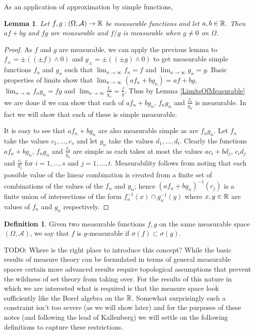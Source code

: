 \documentclass{amsart}
\newtheorem{lem}[thm]{Lemma}
\theoremstyle{remark}
\theoremstyle{definition}
\newtheorem{defn}[thm]{Definition}
\begin{document}
As an application of approximation by simple functions, 
\begin{lem}\label{ArithmeticCombinationsOfMeasurableFunctions}
Let $f,g : (\Omega, \mathcal{A}) \to \mathbb{R}$ be measurable functions
and let $a,b \in \mathbb{R}$.  Then $af + bg$ and $fg$ are measurable and
$f/g$ is measurable when $g \neq 0$ on $\Omega$.
\end{lem}
\begin{proof}As $f$ and $g$ are measurable, we can apply the previous
  lemma to $f_\pm = \pm((\pm f) \wedge 0)$ and $g_{\pm} = \pm((\pm g) \wedge 0)$
  to get measurable simple functions $f_n$ and $g_n$ such that $\lim_{n \to
    \infty} f_n = f$ and $\lim_{n \to
    \infty} g_n = g$.  Basic properties of limits show that $\lim_{n
    \to \infty} (a f_n + b g_n) = a f + b g$, $\lim_{n \to \infty} f_n
  g_n = f g$ and $\lim_{n \to \infty} \frac{f_n}{  g_n} =
  \frac{f}{g}$.  Thus by Lemma \ref{LimitsOfMeasurable} we are done if
  we can show that each of $a f_n + b g_n$, $f_n g_n$ and
  $\frac{f_n}{g_n}$ is measurable.  In fact we will show that each of
  these is simple measurable.

It is easy to see that $a f_n + b g_n$ are also
  measurable simple as are $f_n g_n$.  Let $f_n$ take the values $c_1,
  \dots, c_s$ and let $g_n$ take the values $d_1, \dots, d_t$.  
Clearly the functions  $a f_n + b g_n$, $f_n g_n$ and
  $\frac{f_n}{g_n}$ are simple as each takes at most the values  $a c_i + b d_j$, $c_i d_j$ and
  $\frac{c_i}{d_j}$ for $i=1,\dots,s$ and $j=1,\dots, t$.  
Measurability follows from noting that each
  possible value of the linear combination is created from a finite
  set of combinations of the values of the $f_n$ and $g_n$; hence
  $(af_n + bg_n)^{-1}(c_j)$ is a finite union of intersections of the
  form $f_n^{-1}(x) \cap g_n^{-1}(y)$ where $x,y \in \mathbb{R}$ are
  values of $f_n$ and $g_n$ respectively.
\end{proof}

\begin{defn}Given two measurable functions $f,g$ on the same measurable space
  $(\Omega, \mathcal{A})$, we say that $f$ is $g$-measurable if
  $\sigma(f) \subset \sigma(g)$.
\end{defn}

TODO: Where is the right place to introduce this concept?
While the basic results of measure theory can be formulated in terms
of general measurable spaces certain more advanced results require
topological assumptions that prevent the wildness of set theory from
taking over.  For the results of this nature in which we are
interested what is required is that the measure space look
sufficiently like the Borel algebra on the $\mathbb{R}$.  Somewhat
surprisingly such a constraint isn't too severe (as we will show
later) and for the purposes of these notes (and following the lead
of Kallenberg) we will settle on the following definitions to capture
these restrictions.
\end{document}
